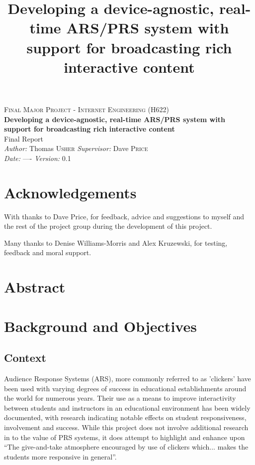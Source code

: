 \documentclass[a4papert,11pt,notitlepage]{ltxdoc}
\title{Developing a device-agnostic, real-time ARS/PRS system with support for
broadcasting rich interactive content}
\begin{document}
\vspace*{\fill}
\begin{center}
\textsc{\Large Final Major Project - Internet Engineering (H622)}\\[0.3cm]
{\Large \bfseries Developing a device-agnostic, real-time ARS/PRS system with support for
broadcasting rich interactive content}\\[0.3cm]
{\Large Final Report}\\[0.3cm]
\emph{Author:} Thomas \textsc{Usher} \hspace{1cm} \emph{Supervisor:} Dave \textsc{Price}\\
\emph{Date:} ---- \hspace{1cm} \emph{Version:} 0.1
\end{center}
\vspace*{\fill}
\pagebreak

\section{Acknowledgements}
With thanks to Dave Price, for feedback, advice and suggestions to myself and the rest of the project group during the development of this project.

Many thanks to Denise Williams-Morris and Alex Kruzewski, for testing, feedback and moral support.

\listoftodos{}
\pagebreak

\section{Abstract}

\tableofcontents

\section{Background and Objectives}
\subsection{Context}
Audience Response Systems (ARS), more commonly referred to as 'clickers' have been used with varying degrees of success in educational establishments around the world for numerous years. Their use as a means to improve interactivity between students and instructors in an educational environment has been widely documented, with research indicating notable effects on student responsiveness, involvement and success. While this project does not involve additional research in to the value of PRS systems, it does attempt to highlight and enhance upon ``The give-and-take atmosphere encouraged by use of clickers which... makes the students more responsive in general''\cite{wood:clickers}.
\end{document}
